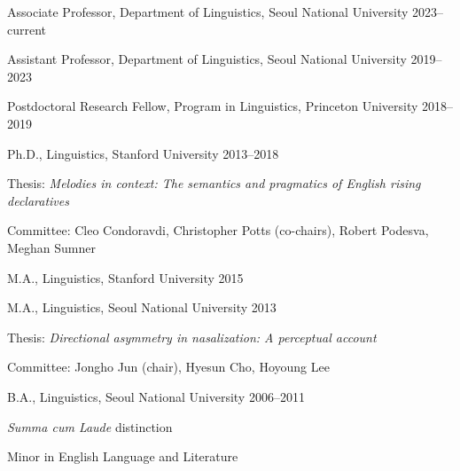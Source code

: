 \documentclass[letterpaper]{article}
\renewenvironment{itemize}{
  \begin{list}{}{
    \setlength{\leftmargin}{1.5em}
  }
}{
  \end{list}
}
\begin{document}
\begin{itemize}\itemsep -1pt
  \item Associate Professor, Department of Linguistics, Seoul National University \hfill 2023--current

  \vspace{0.08in}

  \item Assistant Professor, Department of Linguistics, Seoul National University \hfill 2019--2023

  \vspace{0.08in}

  \item Postdoctoral Research Fellow, Program in Linguistics, Princeton University \hfill 2018--2019

  \vspace{0.08in}

  \item Ph.D., Linguistics, Stanford University \hfill 2013--2018
  
  \vspace{-0.08in}
    
  \begin{itemize}\setlength{\itemsep}{0pt}
  \item Thesis: \emph{Melodies in context: The semantics and pragmatics of English rising declaratives}
  \item Committee: Cleo Condoravdi, Christopher Potts (co-chairs), Robert Podesva, Meghan Sumner
  \end{itemize}

  \item M.A., Linguistics, Stanford University \hfill 2015
  
  \item M.A., Linguistics, Seoul National University \hfill 2013
  
  \vspace{-0.08in}
    
    \begin{itemize}\setlength{\itemsep}{0pt}
    \item Thesis: \emph{Directional asymmetry in nasalization: A perceptual account}
    \item Committee: Jongho Jun (chair), Hyesun Cho, Hoyoung Lee
    \end{itemize}
 
  \item B.A., Linguistics, Seoul National University \hfill 2006--2011
  
  \vspace{-0.08in}
  
    \begin{itemize}\setlength{\itemsep}{0pt}
    \item {\it Summa cum Laude} distinction
    \item Minor in English Language and Literature
    \end{itemize}
  
\end{itemize}
\end{document}
